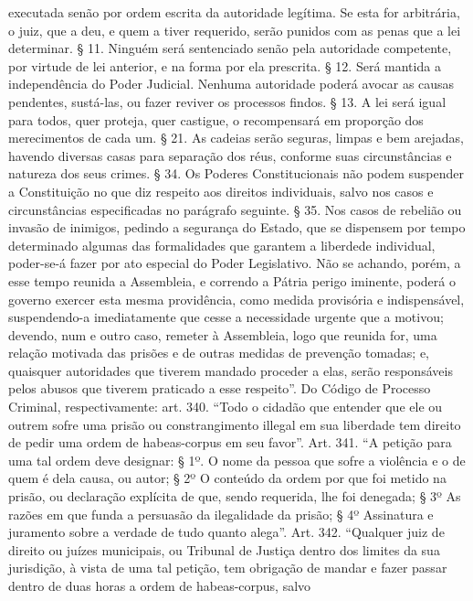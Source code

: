 {  executada senão por ordem escrita da autoridade legítima. Se esta for
  arbitrária, o juiz, que a deu, e quem a tiver requerido, serão punidos
  com as penas que a lei determinar. § 11. Ninguém será sentenciado
  senão pela autoridade competente, por virtude de lei anterior, e na
  forma por ela prescrita. § 12. Será mantida a independência do Poder
  Judicial. Nenhuma autoridade poderá avocar as causas pendentes,
  sustá-las, ou fazer reviver os processos findos. § 13. A lei será
  igual para todos, quer proteja, quer castigue, o recompensará em
  proporção dos merecimentos de cada um. § 21. As cadeias serão seguras,
  limpas e bem arejadas, havendo diversas casas para separação dos réus,
  conforme suas circunstâncias e natureza dos seus crimes. § 34. Os
  Poderes Constitucionais não podem suspender a Constituição no que diz
  respeito aos direitos individuais, salvo nos casos e circunstâncias
  especificadas no parágrafo seguinte. § 35. Nos casos de rebelião ou
  invasão de inimigos, pedindo a segurança do Estado, que se dispensem
  por tempo determinado algumas das formalidades que garantem a
  liberdede individual, poder-se-á fazer por ato especial do Poder
  Legislativo. Não se achando, porém, a esse tempo reunida a Assembleia,
  e correndo a Pátria perigo iminente, poderá o governo exercer esta
  mesma providência, como medida provisória e indispensável,
  suspendendo-a imediatamente que cesse a necessidade urgente que a
  motivou; devendo, num e outro caso, remeter à Assembleia, logo que
  reunida for, uma relação motivada das prisões e de outras medidas de
  prevenção tomadas; e, quaisquer autoridades que tiverem mandado
  proceder a elas, serão responsáveis pelos abusos que tiverem praticado
  a esse respeito''. Do Código de Processo Criminal, respectivamente:
  art. 340. ``Todo o cidadão que entender que ele ou outrem sofre uma
  prisão ou constrangimento illegal em sua liberdade tem direito de
  pedir uma ordem de habeas-corpus em seu favor''. Art. 341. ``A petição
  para uma tal ordem deve designar: § 1º. O nome da pessoa que sofre a
  violência e o de quem é dela causa, ou autor; § 2º O conteúdo da ordem
  por que foi metido na prisão, ou declaração explícita de que, sendo
  requerida, lhe foi denegada; § 3º As razões em que funda a persuasão
  da ilegalidade da prisão; § 4º Assinatura e juramento sobre a verdade
  de tudo quanto alega''. Art. 342. ``Qualquer juiz de direito ou juízes
  municipais, ou Tribunal de Justiça dentro dos limites da sua
  jurisdição, à vista de uma tal petição, tem obrigação de mandar e
  fazer passar dentro de duas horas a ordem de habeas-corpus, salvo
}
